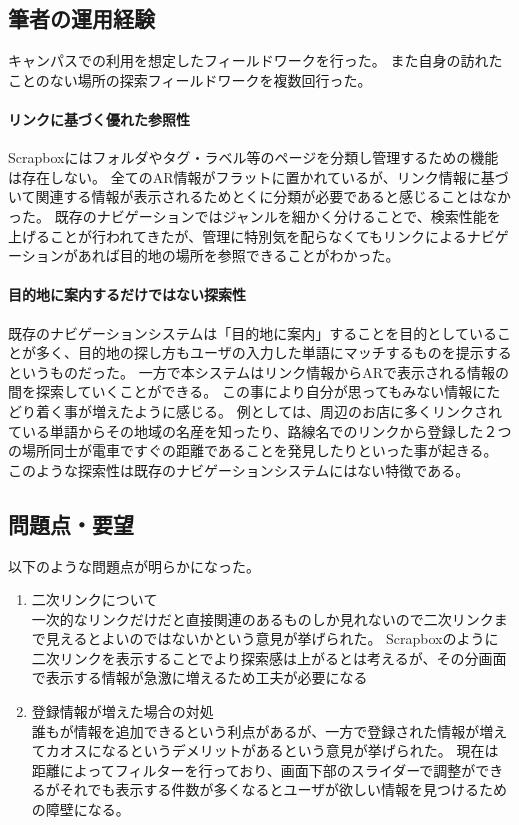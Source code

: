 \subsection{筆者の運用経験}
キャンパスでの利用を想定したフィールドワークを行った。
また自身の訪れたことのない場所の探索フィールドワークを複数回行った。

\paragraph*{リンクに基づく優れた参照性}
Scrapboxにはフォルダやタグ・ラベル等のページを分類し管理するための機能は存在しない。
全てのAR情報がフラットに置かれているが、リンク情報に基づいて関連する情報が表示されるためとくに分類が必要であると感じることはなかった。
既存のナビゲーションではジャンルを細かく分けることで、検索性能を上げることが行われてきたが、管理に特別気を配らなくてもリンクによるナビゲーションがあれば目的地の場所を参照できることがわかった。

\paragraph*{目的地に案内するだけではない探索性}
既存のナビゲーションシステムは「目的地に案内」することを目的としていることが多く、目的地の探し方もユーザの入力した単語にマッチするものを提示するというものだった。
一方で本システムはリンク情報からARで表示される情報の間を探索していくことができる。
この事により自分が思ってもみない情報にたどり着く事が増えたように感じる。
例としては、周辺のお店に多くリンクされている単語からその地域の名産を知ったり、路線名でのリンクから登録した２つの場所同士が電車ですぐの距離であることを発見したりといった事が起きる。
このような探索性は既存のナビゲーションシステムにはない特徴である。


\subsection{問題点・要望}
以下のような問題点が明らかになった。
\begin{enumerate}
  \item 二次リンクについて\\
  一次的なリンクだけだと直接関連のあるものしか見れないので二次リンクまで見えるとよいのではないかという意見が挙げられた。
  Scrapboxのように二次リンクを表示することでより探索感は上がるとは考えるが、その分画面で表示する情報が急激に増えるため工夫が必要になる
  \item 登録情報が増えた場合の対処\\
  誰もが情報を追加できるという利点があるが、一方で登録された情報が増えてカオスになるというデメリットがあるという意見が挙げられた。
  現在は距離によってフィルターを行っており、画面下部のスライダーで調整ができるがそれでも表示する件数が多くなるとユーザが欲しい情報を見つけるための障壁になる。
\end{enumerate}


